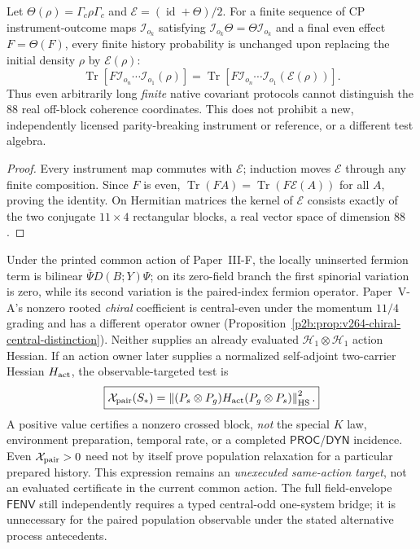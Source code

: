 \documentclass[12pt,a4paper]{article}
\begin{document}
\begin{theorem}
\label{p4:thm:v264-all-history-native-blindness}
Let $\Theta(\rho)=\Gamma_c\rho\Gamma_c$ and
$\mathcal E=(\operatorname{id}+\Theta)/2$. For a finite sequence
of CP instrument-outcome maps $\mathcal I_{o_k}$ satisfying
$\mathcal I_{o_k}\Theta=\Theta\mathcal I_{o_k}$ and a final
even effect $F=\Theta(F)$, every finite history probability is
unchanged upon replacing the initial density $\rho$ by
$\mathcal E(\rho)$:
\[
\boxed{\operatorname{Tr}\!\left[
 F\mathcal I_{o_n}\cdots\mathcal I_{o_1}(\rho)\right]
=\operatorname{Tr}\!\left[
 F\mathcal I_{o_n}\cdots\mathcal I_{o_1}(\mathcal E(\rho))
\right].}
\]
Thus even arbitrarily long \emph{finite} native covariant protocols
cannot distinguish the $88$ real off-block coherence coordinates.
This does not prohibit a new, independently licensed parity-breaking
instrument or reference, or a different test algebra.
\end{theorem}
\begin{proof}
Every instrument map commutes with $\mathcal E$; induction moves
$\mathcal E$ through any finite composition. Since $F$ is even,
$\operatorname{Tr}(FA)=\operatorname{Tr}(F\mathcal E(A))$ for all
$A$, proving the identity. On Hermitian matrices the kernel of
$\mathcal E$ consists exactly of the two conjugate $11\times4$
rectangular blocks, a real vector space of dimension $88$.
\end{proof}

\begin{remark}
\label{p4:rem:v264-paired-action-firewall}
Under the printed common action of Paper~III-F, the locally uninserted
fermion term is bilinear $\bar\Psi D(B;Y)\Psi$; on its zero-field
branch the first spinorial variation is zero, while its second
variation is the paired-index fermion operator. Paper~V-A's nonzero
rooted \emph{chiral} coefficient is central-even under the
momentum $11/4$ grading and has a different operator owner
(Proposition~\ref{p2b:prop:v264-chiral-central-distinction}).
Neither supplies an already evaluated $\mathcal H_1\otimes\mathcal H_1$
action Hessian. If an action owner later supplies a normalized
self-adjoint two-carrier Hessian $H_{\rm act}$, the observable-targeted
test is
\[
 \boxed{\mathcal X_{\rm pair}(S_*)=
 \left\|(P_s\otimes P_g)H_{\rm act}
 (P_g\otimes P_s)\right\|_{\rm HS}^2.}
\]
A positive value certifies a nonzero crossed block, \emph{not}
the special $K$ law, environment preparation, temporal rate, or a
completed $\mathsf{PROC}$/$\mathsf{DYN}$ incidence. Even $\mathcal
X_{\rm pair}>0$ need not by itself prove population relaxation for
a particular prepared history. This expression remains an
\emph{unexecuted same-action target}, not an evaluated certificate
in the current common action. The full field-envelope
$\mathsf{FENV}$ still independently requires a typed central-odd
one-system bridge; it is unnecessary for the paired population
observable under the stated alternative process antecedents.
\end{remark}
\end{document}
